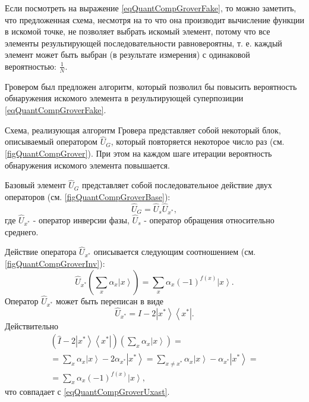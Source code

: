 

Если посмотреть на выражение \eqref{eqQuantCompGroverFake}, то можно
заметить, что предложенная схема, несмотря на то что она производит
вычисление функции в искомой точке, не позволяет выбрать искомый
элемент, потому что все элементы результирующей последовательности
равновероятны, т. е. каждый элемент может быть выбран (в результате
измерения) с одинаковой вероятностью: $\frac{1}{N}$.

Гровером был предложен алгоритм, который позволил бы повысить
вероятность обнаружения искомого элемента в результирующей
суперпозиции \eqref{eqQuantCompGroverFake}.





Схема, реализующая алгоритм Гровера представляет собой некоторый блок,
описываемый оператором $\hat{U}_G$, который повторяется некоторое число
раз (см. \autoref{figQuantCompGrover}). При этом на каждом шаге
итерации вероятность обнаружения искомого элемента повышается. 

Базовый элемент $\hat{U}_G$ представляет собой последовательное действие
двух операторов (см. \autoref{figQuantCompGroverBase}):
\begin{equation}
\hat{U}_G=\hat{U}_s\hat{U}_{x^{\ast}},
\nonumber
\end{equation}
где $\hat{U}_{x^{\ast}}$ - оператор инверсии фазы, $\hat{U}_s$
- оператор обращения относительно среднего.



Действие оператора $\hat{U}_{x^{\ast}}$ описывается следующим соотношением
(см. \autoref{figQuantCompGroverInv}):
\begin{equation}
\hat{U}_{x^{\ast}}\left(\sum_x \alpha_x \left|x\right>\right) = 
\sum_x \alpha_x \left(-1\right)^{f\left(x\right)}\left|x\right>.
\label{eqQuantCompGroverUxast}
\end{equation} 
Оператор $\hat{U}_{x^{\ast}}$ может быть переписан в виде
\begin{equation}
\hat{U}_{x^{\ast}} = \hat{I} - 2 \left|x^{\ast}\right>\left<x^{\ast}\right|.
\nonumber
\end{equation} 
Действительно
\begin{eqnarray}
\left(\hat{I} - 2 \left|x^{\ast}\right>\left<x^{\ast}\right|\right)
\left(\sum_x \alpha_x \left|x\right>\right) =
\nonumber \\
= \sum_x \alpha_x \left|x\right> - 2 \alpha_{x^{\ast}}
\left|x^{\ast}\right> = 
\sum_{x\ne x^{\ast}} \alpha_x \left|x\right> -  \alpha_{x^{\ast}}
\left|x^{\ast}\right> =
\nonumber \\
=
\sum_x \alpha_x \left(-1\right)^{f\left(x\right)}\left|x\right>,
\nonumber
\end{eqnarray}
что совпадает с \eqref{eqQuantCompGroverUxast}.

